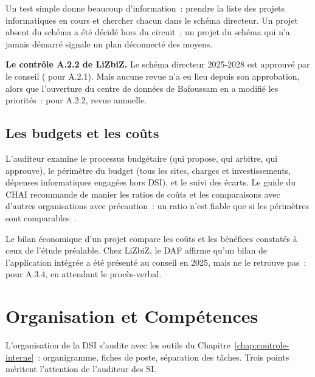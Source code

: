 Un test simple donne beaucoup d'information~: prendre la liste des projets
informatiques en cours et chercher chacun dans le schéma directeur. Un
projet absent du schéma a été décidé hors du circuit~; un projet du
schéma qui n'a jamais démarré signale un plan déconnecté des moyens.

\begin{boxinfo}
\textbf{Le contrôle A.2.2 de LiZbiZ.} Le schéma directeur 2025-2028 est
approuvé par le conseil (\OUI{} pour A.2.1). Mais aucune revue n'a eu
lieu depuis son approbation, alors que l'ouverture du centre de données de
Bafoussam en a modifié les priorités~: \NON{} pour A.2.2, revue annuelle.
\end{boxinfo}

\subsection{Les budgets et les coûts}

L'auditeur examine le processus budgétaire (qui propose, qui arbitre, qui
approuve), le périmètre du budget (tous les sites, charges et
investissements, dépenses informatiques engagées hors DSI), et le suivi
des écarts. Le guide du CHAI recommande de manier les ratios de coûts et
les comparaisons avec d'autres organisations avec précaution~: un ratio
n'est fiable que si les périmètres sont comparables~\cite{chai2014guide}.

Le bilan économique d'un projet compare les coûts et les bénéfices
constatés à ceux de l'étude préalable. Chez LiZbiZ, le DAF affirme qu'un
bilan de l'application intégrée a été présenté au conseil en 2025, mais
ne le retrouve pas~: \NEK{} pour A.3.4, en attendant le procès-verbal.

\section{Organisation et Compétences}
\label{sec:c17-organisation}

L'organisation de la DSI s'audite avec les outils du
Chapitre~\ref{chap:controle-interne}~: organigramme, fiches de poste,
séparation des tâches. Trois points méritent l'attention de l'auditeur
des SI.

